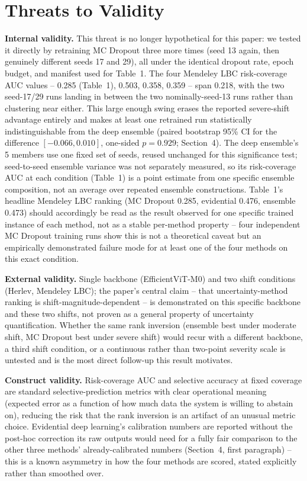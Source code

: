 \documentclass[runningheads]{llncs}
\begin{document}
\section{Threats to Validity}

\textbf{Internal validity.} This threat is no longer hypothetical for this
paper: we tested it directly by retraining MC Dropout three more times
(seed 13 again, then genuinely different seeds 17 and 29), all under the
identical dropout rate, epoch budget, and manifest used for Table~1. The
four Mendeley LBC risk-coverage AUC values -- 0.285 (Table~1), 0.503, 0.358,
0.359 -- span 0.218, with the two seed-17/29 runs landing in between the
two nominally-seed-13 runs rather than clustering near either. This large
enough swing erases the reported severe-shift advantage entirely and
makes at least one retrained run statistically indistinguishable from the
deep ensemble (paired bootstrap 95\% CI for the difference $[-0.066,
0.010]$, one-sided $p=0.929$; Section~4). The deep ensemble's 5 members
use one fixed set of seeds, reused unchanged for this significance test;
seed-to-seed ensemble variance was not separately measured, so its
risk-coverage AUC at each condition (Table~1) is a point estimate from one
specific ensemble composition, not an average over repeated ensemble
constructions. Table~1's headline Mendeley LBC ranking (MC Dropout 0.285,
evidential 0.476, ensemble 0.473) should accordingly be read as the
result observed for one specific trained instance of each method, not as
a stable per-method property -- four independent MC Dropout training runs
show this is not a theoretical caveat but an empirically demonstrated
failure mode for at least one of the four methods on this exact
condition.

\textbf{External validity.} Single backbone (EfficientViT-M0) and two
shift conditions (Herlev, Mendeley LBC); the paper's central claim --
that uncertainty-method ranking is shift-magnitude-dependent -- is
demonstrated on this specific backbone and these two shifts, not proven
as a general property of uncertainty quantification. Whether the same
rank inversion (ensemble best under moderate shift, MC Dropout best under
severe shift) would recur with a different backbone, a third shift
condition, or a continuous rather than two-point severity scale is
untested and is the most direct follow-up this result motivates.

\textbf{Construct validity.} Risk-coverage AUC and selective accuracy at
fixed coverage are standard selective-prediction metrics with clear
operational meaning (expected error as a function of how much data the
system is willing to abstain on), reducing the risk that the rank
inversion is an artifact of an unusual metric choice. Evidential deep
learning's calibration numbers are reported without the post-hoc
correction its raw outputs would need for a fully fair comparison to the
other three methods' already-calibrated numbers (Section~4, first
paragraph) -- this is a known asymmetry in how the four methods are
scored, stated explicitly rather than smoothed over.
\end{document}
